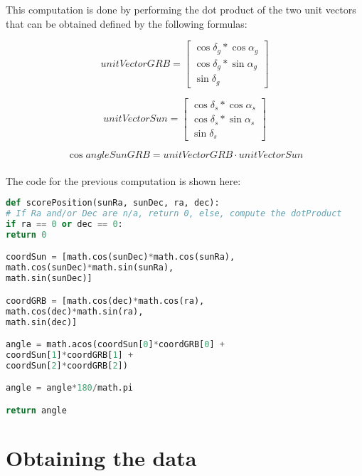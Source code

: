 This computation is done by performing the dot product of the two unit vectors that can be obtained defined by the following formulas:

\begin{equation} \label{eq:1}
	unitVectorGRB =	
	\begin{bmatrix}
	\cos\delta_{g} * \cos\alpha_{g} \\ 
	\cos\delta_{g} * \sin\alpha_{g} \\
	\sin\delta_{g}
	\end{bmatrix}
\end{equation}

\begin{equation} \label{eq:2}
	unitVectorSun =	
	\begin{bmatrix}
	\cos\delta_{s} * \cos\alpha_{s} \\ 
	\cos\delta_{s} * \sin\alpha_{s} \\
	\sin\delta_{s}
	\end{bmatrix}
\end{equation}

\begin{equation} \label{eq:3}
	\cos angleSunGRB = unitVectorGRB \cdot unitVectorSun
\end{equation}\\

The code for the previous computation is shown here:\\

\begin{minipage}{\linewidth}
\begin{lstlisting}[language=Python, caption=Python function for computing the angle]
def scorePosition(sunRa, sunDec, ra, dec):
# If Ra and/or Dec are n/a, return 0, else, compute the dotProduct
if ra == 0 or dec == 0:
return 0

coordSun = [math.cos(sunDec)*math.cos(sunRa),
math.cos(sunDec)*math.sin(sunRa), 
math.sin(sunDec)]

coordGRB = [math.cos(dec)*math.cos(ra),
math.cos(dec)*math.sin(ra),
math.sin(dec)]

angle = math.acos(coordSun[0]*coordGRB[0] +
coordSun[1]*coordGRB[1] +
coordSun[2]*coordGRB[2])

angle = angle*180/math.pi

return angle\end{lstlisting}
\end{minipage}

\section{Obtaining the data}

